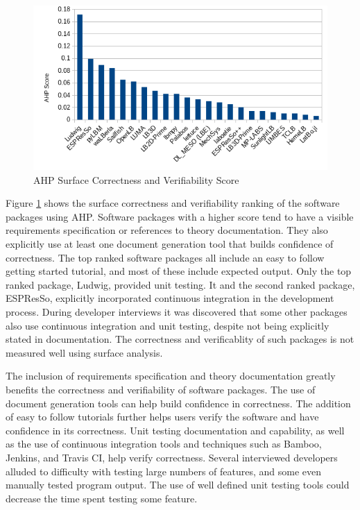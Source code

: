 \documentclass[12pt, notitlepage]{article}
\begin{document}
\begin{figure}[h!]
	\begin{center}
		\includegraphics[width=1.0\textwidth]{correctnessverifiability_chart}
		\caption{AHP Surface Correctness and Verifiability Score}
		\label{Fig_CorrectnessVerifiability}
	\end{center}
\end{figure}

Figure \ref{Fig_CorrectnessVerifiability} shows the surface correctness and verifiability ranking of the software packages using AHP. Software packages with a higher score tend to have a visible requirements specification or references to theory documentation. They also explicitly use at least one document generation tool that builds confidence of correctness. The top ranked software packages all include an easy to follow getting started tutorial, and most of these include expected output. Only the top ranked package, Ludwig, provided unit testing. It and the second ranked package, ESPResSo, explicitly incorporated continuous integration in the development process. During developer interviews it was discovered that some other packages also use continuous integration and unit testing, despite not being explicitly stated in documentation. The correctness and verificablity of such packages is not measured well using surface analysis.

The inclusion of requirements specification and theory documentation greatly benefits the correctness and verifiability of software packages. The use of document generation tools can help build confidence in correctness. The addition of easy to follow tutorials further helps users verify the software and have confidence in its correctness. Unit testing documentation and capability, as well as the use of continuous integration tools and techniques such as Bamboo, Jenkins, and Travis CI, help verify correctness. Several interviewed developers alluded to difficulty with testing large numbers of features, and some even manually tested program output. The use of well defined unit testing tools could decrease the time spent testing some feature.
\end{document}
